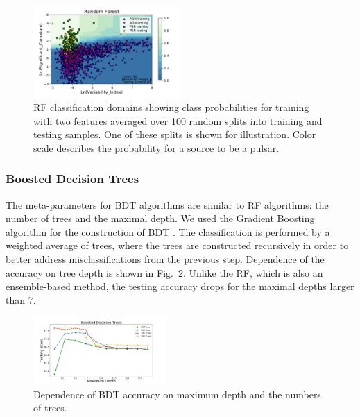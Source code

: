 \documentclass{aa}
\newcommand{\twopicsp}{0.45}
\begin{document}
\begin{figure}[h]
\centering
\includegraphics[width=0.5\textwidth]{plots/classification_domains/rf_50_6_final.pdf}
\caption{RF classification domains showing class probabilities for training with two features
averaged over 100 random splits into training and testing samples.
One of these splits is shown for illustration.
Color scale describes the probability for a source to be a pulsar.
}
\label{fig:RF_domains}
\end{figure}



\subsubsection{Boosted Decision Trees}

The meta-parameters for BDT algorithms are similar to RF algorithms: the number of trees and the maximal depth.
We used the Gradient Boosting algorithm for the construction of BDT \citep{gb}.
The classification is performed by a weighted average of trees, where the trees are constructed recursively in order to better address 
misclassifications from the previous step. 
Dependence of the accuracy on tree depth is shown in Fig.~\ref{fig:BDT_depth}. 
Unlike the RF, which is also an ensemble-based method, the testing accuracy drops for the maximal depths larger than 7. 


\begin{figure}[h]
\centering
\includegraphics[width=\twopicsp\textwidth]{plots/bdt_train_assocnewfeats.pdf}
\caption{Dependence of BDT accuracy on maximum depth and the numbers of trees.}
\label{fig:BDT_depth}
\end{figure}
\end{document}
